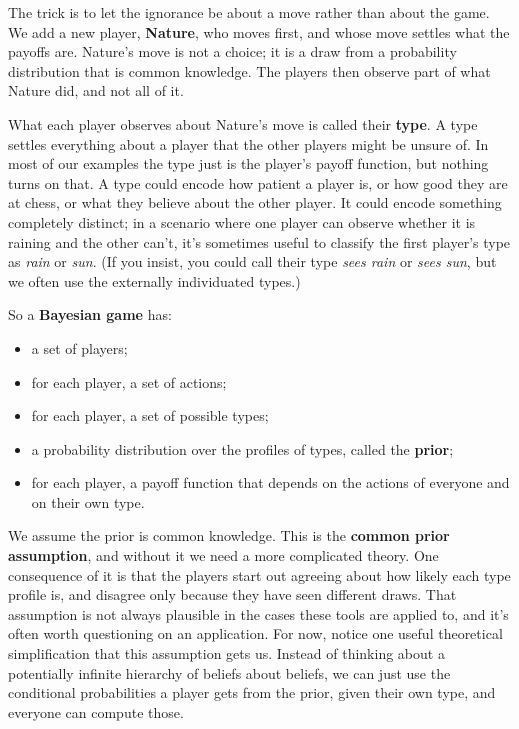 \documentclass[
  11pt,
  letterpaper,
]{scrbook}
\providecommand{\tightlist}{%
  \setlength{\itemsep}{0pt}\setlength{\parskip}{0pt}}
\begin{document}
The trick is to let the ignorance be about a move rather than about the
game. We add a new player, \textbf{Nature}, who moves first, and whose
move settles what the payoffs are. Nature's move is not a choice; it is
a draw from a probability distribution that is common knowledge. The
players then observe part of what Nature did, and not all of it.

What each player observes about Nature's move is called their
\textbf{type}. A type settles everything about a player that the other
players might be unsure of. In most of our examples the type just is the
player's payoff function, but nothing turns on that. A type could encode
how patient a player is, or how good they are at chess, or what they
believe about the other player. It could encode something completely
distinct; in a scenario where one player can observe whether it is
raining and the other can't, it's sometimes useful to classify the first
player's type as \emph{rain} or \emph{sun}. (If you insist, you could
call their type \emph{sees rain} or \emph{sees sun}, but we often use
the externally individuated types.)

So a \textbf{Bayesian game} has:

\begin{itemize}
\tightlist
\item
  a set of players;
\item
  for each player, a set of actions;
\item
  for each player, a set of possible types;
\item
  a probability distribution over the profiles of types, called the
  \textbf{prior};
\item
  for each player, a payoff function that depends on the actions of
  everyone and on their own type.
\end{itemize}

We assume the prior is common knowledge. This is the \textbf{common
prior assumption}, and without it we need a more complicated theory. One
consequence of it is that the players start out agreeing about how
likely each type profile is, and disagree only because they have seen
different draws. That assumption is not always plausible in the cases
these tools are applied to, and it's often worth questioning on an
application. For now, notice one useful theoretical simplification that
this assumption gets us. Instead of thinking about a potentially
infinite hierarchy of beliefs about beliefs, we can just use the
conditional probabilities a player gets from the prior, given their own
type, and everyone can compute those.
\end{document}
